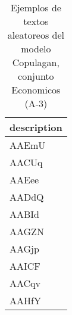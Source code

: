 \begin{table}[H]
\centering
\fontsize{8}{14}\selectfont
\caption{Ejemplos de textos aleatoreos del modelo Copulagan, conjunto Economicos (A-3)}
\label{table-sample10-economicos-a-3-copulagan-text}
\begin{tabular}{|m{50em}|}
\hline
\rowcolor[gray]{0.8}
description \\
\hline AAEmU \\
\hline AACUq \\
\hline AAEee \\
\hline AADdQ \\
\hline AABId \\
\hline AAGZN \\
\hline AAGjp \\
\hline AAICF \\
\hline AACqv \\
\hline AAHfY \\
\hline
\end{tabular}
\end{table}
